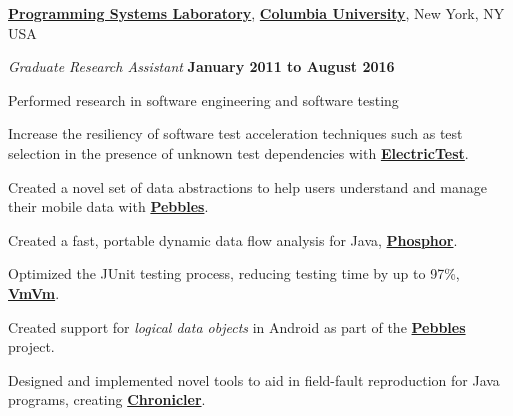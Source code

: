 \documentclass[10pt]{article}
\begin{document}
\halfblankline


\href{http://www.psl.cs.columbia.edu/}{\textbf{Programming Systems Laboratory}}, \href{http://www.columbia.edu}{\textbf{Columbia University}},
New York, NY USA
\begin{outerlist}
\item[] \textit{Graduate Research Assistant}%
    \hfill \textbf{January 2011 to August 2016}
    \begin{innerlist}%
    \item Performed research in software engineering and software testing
    \item Increase the resiliency of software test acceleration techniques such as test selection in the presence of unknown test dependencies with \href{http://jonbell.net/publications/electrictest}{\textbf{ElectricTest}}. 
    	\item Created a novel set of data abstractions to help users understand and manage their mobile data with \href{http://jonbell.net/publications/pebbles}{\textbf{Pebbles}}.
            \item Created a fast, portable dynamic data flow analysis for Java, \href{http://jonbell.net/publications/phosphor}{\textbf{Phosphor}}.
            \item Optimized the JUnit testing process, reducing testing time by up to 97\%, \href{http://jonbell.net/publications/vmvm}{\textbf{VmVm}}.
           \item Created support for \emph{logical data objects} in Android as part of the \href{http://www.psl.cs.columbia.edu/1194/android-privacy/}{\textbf{Pebbles}} project.
        \item Designed and implemented novel tools to aid in field-fault reproduction for Java programs, creating \href{http://jonbell.net/publications/chronicler}{\textbf{Chronicler}}.
        \end{innerlist}

\end{outerlist}
\end{document}
